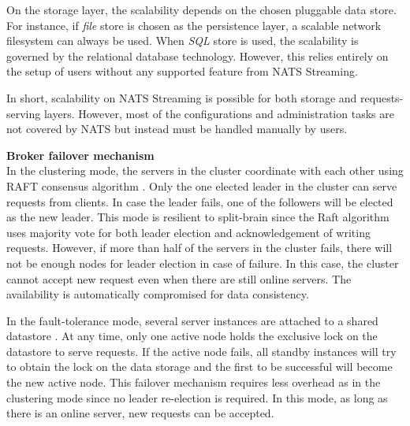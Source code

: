 On the storage layer, the scalability depends on the chosen pluggable data store. For instance, if \emph{file} store is chosen as the persistence layer, a scalable network filesystem can always be used. When \emph{SQL} store is used, the scalability is governed by the relational database technology. However, this relies entirely on the setup of users without any supported feature from NATS Streaming. 

In short, scalability on NATS Streaming is possible for both storage and requests-serving layers. However, most of the configurations and administration tasks are not covered by NATS but instead must be handled manually by users. 

\textbf{Broker failover mechanism}\\
In the clustering mode, the servers in the cluster coordinate with each other using RAFT consensus algorithm \cite{raftalg}. Only the one elected leader in the cluster can serve requests from clients. In case the leader fails, one of the followers will be elected as the new leader. This mode is resilient to split-brain since the Raft algorithm uses majority vote for both leader election and acknowledgement of writing requests. However, if more than half of the servers in the cluster fails, there will not be enough nodes for leader election in case of failure. In this case, the cluster cannot accept new request even when there are still online servers. The availability is automatically compromised for data consistency. 

In the fault-tolerance mode, several server instances are attached to a shared datastore \cite{natsstreaming}. At any time, only one active node holds the exclusive lock on the datastore to serve requests. If the active node fails, all standby instances will try to obtain the lock on the data storage and the first to be successful will become the new active node. This failover mechanism requires less overhead as in the clustering mode since no leader re-election is required. In this mode, as long as there is an online server, new requests can be accepted.